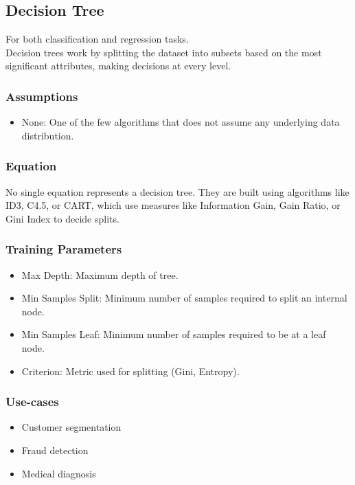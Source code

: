 \documentclass[english]{latex4ei/latex4ei_sheet}
\begin{document}
\begin{sectionbox}
    \subsection{Decision Tree}
For both classification and regression tasks. \\
Decision trees work by splitting the dataset into subsets based on the most significant attributes, making decisions at every level.

\subsubsection{Assumptions}
\begin{itemize}
    \item None: One of the few algorithms that does not assume any underlying data distribution.
\end{itemize}

\subsubsection{Equation}
No single equation represents a decision tree. They are built using algorithms like ID3, C4.5, or CART, which use measures like Information Gain, Gain Ratio, or Gini Index to decide splits.

\subsubsection{Training Parameters}
\begin{itemize}
    \item Max Depth: Maximum depth of tree.
    \item Min Samples Split: Minimum number of samples required to split an internal node.
    \item Min Samples Leaf: Minimum number of samples required to be at a leaf node.
    \item Criterion: Metric used for splitting (Gini, Entropy).
\end{itemize}

\subsubsection{Use-cases}
\begin{itemize}
    \item Customer segmentation
    \item Fraud detection
    \item Medical diagnosis
\end{itemize}


\end{sectionbox}
\end{document}
